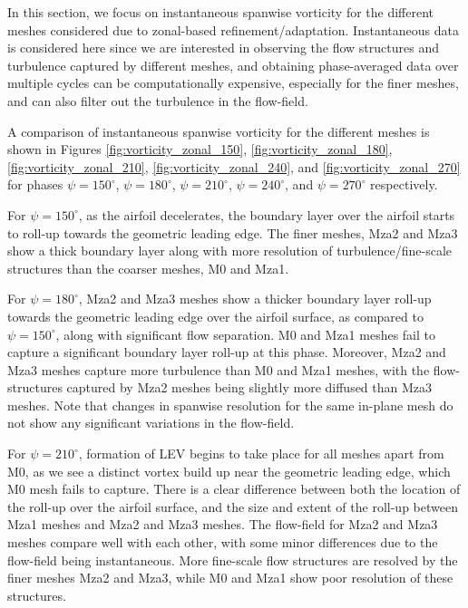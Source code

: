 In this section, we focus on instantaneous spanwise vorticity for the different meshes considered due to zonal-based refinement/adaptation. Instantaneous data is considered here since we are interested in observing the flow structures and turbulence captured by different meshes, and obtaining phase-averaged data over multiple cycles can be computationally expensive, especially for the finer meshes, and can also filter out the turbulence in the flow-field.

A comparison of instantaneous spanwise vorticity for the different meshes is shown in Figures \ref{fig:vorticity_zonal_150}, \ref{fig:vorticity_zonal_180}, \ref{fig:vorticity_zonal_210}, \ref{fig:vorticity_zonal_240}, and \ref{fig:vorticity_zonal_270} for phases $\psi=150^\circ$, $\psi=180^\circ$, $\psi=210^\circ$, $\psi=240^\circ$, and $\psi=270^\circ$ respectively. 

For $\psi=150^\circ$, as the airfoil decelerates, the boundary layer over the airfoil starts to roll-up towards the geometric leading edge. The finer meshes, Mza2 and Mza3 show a thick boundary layer along with more resolution of turbulence/fine-scale structures than
the coarser meshes, M0 and Mza1.

For $\psi=180^\circ$, Mza2 and Mza3 meshes show a thicker boundary layer roll-up towards the geometric leading edge over the airfoil surface, as compared to $\psi=150^\circ$, along with significant flow separation. M0 and Mza1 meshes fail to capture a significant boundary layer roll-up at this phase. Moreover, Mza2 and Mza3 meshes capture more turbulence than M0 and Mza1 meshes, with the flow-structures captured by Mza2 meshes being slightly more diffused than Mza3 meshes. Note that changes in spanwise resolution for the same in-plane mesh do not show any significant variations in the flow-field.

For $\psi=210^\circ$, formation of LEV begins to take place for all meshes apart from M0, as we see a distinct vortex build up near the geometric leading edge, which M0 mesh fails to capture. There is a clear difference between both the location of the roll-up over the airfoil surface, and the size and extent of the roll-up between Mza1 meshes and Mza2 and Mza3 meshes. The flow-field for Mza2 and Mza3 meshes compare well with each other, with some minor differences due to the flow-field being instantaneous. More fine-scale flow structures are resolved by the finer meshes Mza2 and Mza3, while M0 and Mza1 show poor resolution of these structures.


